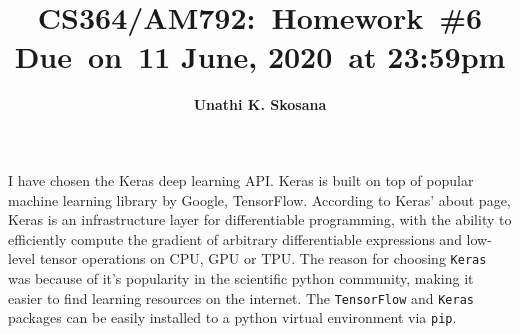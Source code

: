 

\newcommand{\hmwkTitle}{Homework\ \#6}
\newcommand{\hmwkDueDate}{11 June, 2020}
\newcommand{\hmwkClass}{CS364/AM792}
\newcommand{\hmwkAuthorName}{\textbf{Unathi K. Skosana}}


\title{
    \vspace{2in}
    \textmd{\textbf{\hmwkClass:\ \hmwkTitle}}\\
    \normalsize\vspace{0.1in}\small{Due\ on\ \hmwkDueDate\ at 23:59pm}\\
    \vspace{3in}
}

\author{\hmwkAuthorName}
\date{}

\renewcommand{\part}[1]{\textbf{\large Part \Alph{partCounter}}\stepcounter{partCounter}\\}

\newcommand{\solution}{\textbf{\large Solution}}



\maketitle

\pagebreak

\begin{homeworkProblem}
  I have chosen the Keras deep learning API. Keras is built on top of popular
  machine learning library by Google, TensorFlow. According to Keras' about page,
  Keras is an infrastructure layer for differentiable programming, with the
  ability to efficiently compute the gradient of arbitrary differentiable
  expressions and low-level tensor operations on CPU, GPU or TPU. The reason for
  choosing \texttt{Keras} was because of it's
  popularity in the scientific python community, making it easier to find
  learning resources on the internet. The \texttt{TensorFlow}
  and \texttt{Keras} packages can be easily installed to a
  python virtual environment via \texttt{pip}.
\end{homeworkProblem}

\pagebreak

